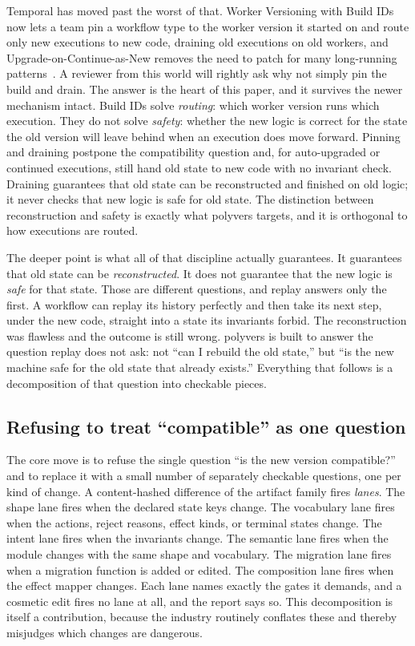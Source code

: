 \documentclass[11pt]{article}
\newcommand{\tool}[1]{\textsf{#1}}
\begin{document}
Temporal has moved past the worst of that. Worker Versioning with Build IDs now
lets a team pin a workflow type to the worker version it started on and route
only new executions to new code, draining old executions on old workers, and
Upgrade-on-Continue-as-New removes the need to patch for many long-running
patterns~\cite{temporalwv}. A reviewer from this world will rightly ask why not
simply pin the build and drain. The answer is the heart of this paper, and it
survives the newer mechanism intact. Build IDs solve \emph{routing}: which
worker version runs which execution. They do not solve \emph{safety}: whether
the new logic is correct for the state the old version will leave behind when an
execution does move forward. Pinning and draining postpone the compatibility
question and, for auto-upgraded or continued executions, still hand old state to
new code with no invariant check. Draining guarantees that old state can be
reconstructed and finished on old logic; it never checks that new logic is safe
for old state. The distinction between reconstruction and safety is exactly what
\tool{polyvers} targets, and it is orthogonal to how executions are routed.

The deeper point is what all of that discipline actually guarantees. It
guarantees that old state can be \emph{reconstructed}. It does not guarantee
that the new logic is \emph{safe} for that state. Those are different questions,
and replay answers only the first. A workflow can replay its history perfectly
and then take its next step, under the new code, straight into a state its
invariants forbid. The reconstruction was flawless and the outcome is still
wrong. \tool{polyvers} is built to answer the question replay does not ask: not
``can I rebuild the old state,'' but ``is the new machine safe for the old
state that already exists.'' Everything that follows is a decomposition of that
question into checkable pieces.

\subsection{Refusing to treat ``compatible'' as one question}

The core move is to refuse the single question ``is the new version
compatible?'' and to replace it with a small number of separately checkable
questions, one per kind of change. A content-hashed difference of the artifact
family fires \emph{lanes}. The shape lane fires when the declared state keys
change. The vocabulary lane fires when the actions, reject reasons, effect
kinds, or terminal states change. The intent lane fires when the invariants
change. The semantic lane fires when the module changes with the same shape and
vocabulary. The migration lane fires when a migration function is added or
edited. The composition lane fires when the effect mapper changes. Each lane
names exactly the gates it demands, and a cosmetic edit fires no lane at all,
and the report says so. This decomposition is itself a contribution, because
the industry routinely conflates these and thereby misjudges which changes are
dangerous.
\end{document}
